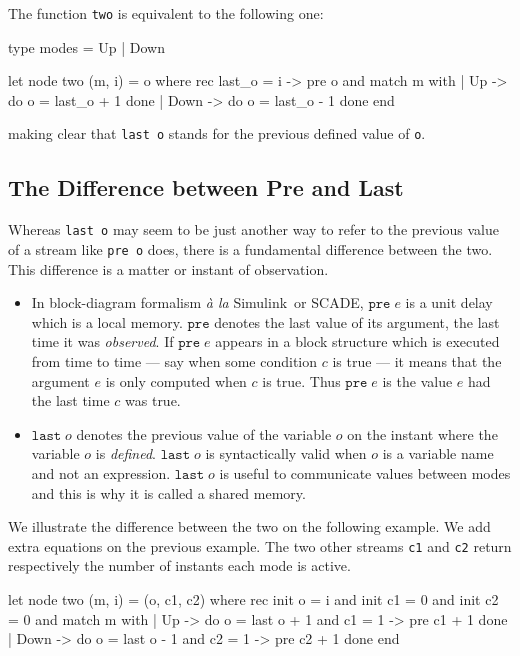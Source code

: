 \documentclass[11pt,titlepage,twoside]{report}
\newcommand{\simulink}{{\sf Simulink}}
\newcommand{\scade}{{\sf SCADE}}
\begin{document}
\medskip\noindent
The function \texttt{two} is equivalent to the following one:
\begin{runverbatim}[hide,label=updownmodes]
type modes = Up | Down
\end{runverbatim}
\begin{runverbatim}[continue]
let node two (m, i) = o where
  rec last_o = i -> pre o
  and match m with
      | Up -> do o = last_o + 1 done
      | Down -> do o = last_o - 1 done
      end
\end{runverbatim}
making clear that \verb-last o- stands for the previous defined value
of \verb-o-.

\subsection{The Difference between Pre and Last}
Whereas \verb-last o- may seem
to be just another way to refer to the previous value of a stream like
\verb-pre o- does, there is a fundamental difference between the
two. This difference is a matter or instant of observation.

\begin{itemize}
\item
In block-diagram formalism {\em \`a la}
\simulink\ or \scade, $\texttt{pre}\;e$ is a unit delay which
is a local memory. $\texttt{pre}$ denotes the last value of its argument, the
last time it was {\em observed}. If $\texttt{pre}\;e$ appears in a
block structure which is executed from time to time --- say when some condition
$c$ is true --- it means that the argument $e$ is only computed when
$c$ is true. Thus $\texttt{pre}\;e$ is the value $e$ had the last time $c$ was true.
\item
$\texttt{last}\;o$ denotes the previous value of the variable $o$ on
  the instant where the variable $o$ is {\em defined}.
  $\texttt{last}\;o$ is syntactically valid when $o$ is a variable name and
  not an expression.  $\texttt{last}\;o$ is useful to communicate
  values between modes and this is why it is called a shared memory.
\end{itemize}

We illustrate the difference between the two on the following
example. We add extra equations on the previous example. The two other streams
\verb-c1- and \verb-c2-
return respectively the number of instants each mode is active.
\begin{runverbatim}[include=updownmodes]
let node two (m, i) = (o, c1, c2) where
  rec init o = i
  and init c1 = 0
  and init c2 = 0
  and match m with
       | Up -> do o = last o + 1
              and c1 = 1 -> pre c1 + 1
              done
       | Down -> do o = last o - 1
                 and c2 = 1 -> pre c2 + 1
                 done
    end
\end{runverbatim}
\end{document}
